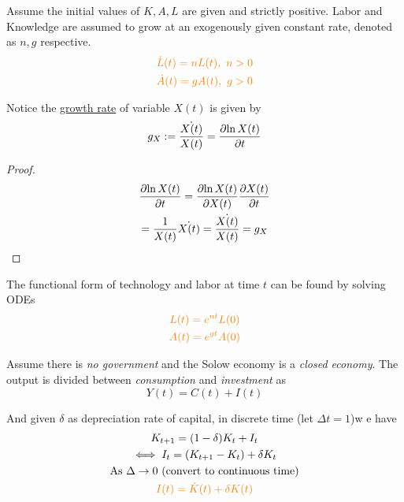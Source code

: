 \documentclass[11pt]{article}
\begin{document}
			\begin{assumption}
				Assume the initial values of $K, A, L$ are given and strictly positive. Labor and Knowledge are assumed to grow at an exogenously given constant rate, denoted as $n, g$ respective.
				\begin{gather}
				\textcolor{orange}{
					\dot{L}(t) = nL(t),\ n > 0 }\\
					\textcolor{orange}{
						\dot{A}(t) = gA(t),\ g > 0
					}
				\end{gather}
			\end{assumption}
			
			\begin{proposition}
				Notice the \ul{growth rate} of variable $X(t)$ is given by 
				\[
					g_X := \frac{\dot{X(t)}}{X(t)} = \frac{\partial{\ln{X(t)}}}{\partial{t}}
				\]
			\end{proposition}
			\begin{proof}
				\begin{gather*}
					\frac{\partial{\ln{X(t)}}}{\partial{t}} = \frac{\partial{\ln{X(t)}}}{\partial{X(t)}} \frac{\partial{X(t)}}{\partial{t}} \\
					= \frac{1}{X(t)} \dot{X(t)}
					= \frac{\dot{X(t)}}{X(t)}
					= g_X \\
				\end{gather*}
			\end{proof}
			
			\begin{proposition}
				The functional form of technology and labor at time $t$ can be found by solving ODEs 
				\begin{gather}
					\textcolor{orange}{
						L(t) = e^{nt} L(0)
						} \\
					\textcolor{orange}{
						A(t) = e^{gt} A(0)
						}
				\end{gather}
			\end{proposition}
			
			\begin{assumption}
				Assume there is \emph{no government} and the Solow economy is a \emph{closed economy}. The output is divided between \emph{consumption} and \emph{investment} as 
				\begin{equation}
					Y(t) = C(t) + I(t)
				\end{equation}
			\end{assumption}
			\par And given $\delta$ as depreciation rate of capital, in discrete time (let $\Delta t = 1$)w e have 
			\begin{gather}
				K_{t+1} = (1-\delta)K_t + I_t \\
				\iff I_t = (K_{t+1} - K_t) + \delta K_t \\
				\text{{As }} \Delta \to 0 \text{{ (convert to continuous time)}}\\
				\textcolor{orange}{I(t) = \dot{K}(t) + \delta K(t)}
			\end{gather}
			
\end{document}
